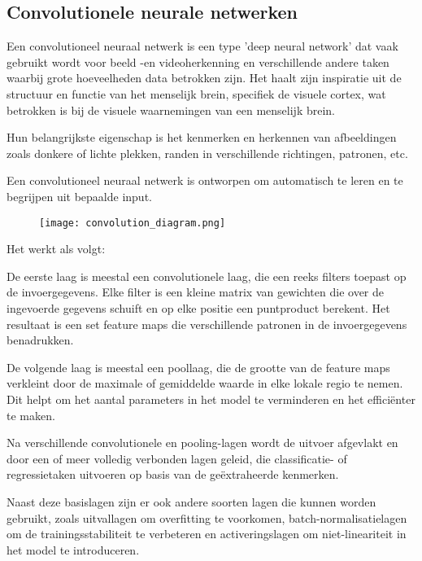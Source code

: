 \subsection{Convolutionele neurale netwerken}

Een convolutioneel neuraal netwerk is een type 'deep neural network' dat vaak gebruikt wordt voor beeld -en videoherkenning en verschillende andere taken waarbij grote hoeveelheden data betrokken zijn. Het haalt zijn inspiratie uit de structuur en functie van het menselijk brein, specifiek de visuele cortex, wat betrokken is bij de visuele waarnemingen van een menselijk brein.

Hun belangrijkste eigenschap is het kenmerken en herkennen van afbeeldingen zoals donkere of lichte plekken, randen in verschillende richtingen, patronen, etc.

Een convolutioneel neuraal netwerk is ontworpen om automatisch te leren en te begrijpen uit bepaalde input. 

\begin{figure}[htbp]
    \centering
    \texttt{[image: convolution\_diagram.png]}
    \caption{\cite{Moor2017}}
    \label{fig:convolution_diagram}
\end{figure}

Het werkt als volgt: 

De eerste laag is meestal een convolutionele laag, die een reeks filters toepast op de invoergegevens. Elke filter is een kleine matrix van gewichten die over de ingevoerde gegevens schuift en op elke positie een puntproduct berekent. Het resultaat is een set feature maps die verschillende patronen in de invoergegevens benadrukken.

De volgende laag is meestal een poollaag, die de grootte van de feature maps verkleint door de maximale of gemiddelde waarde in elke lokale regio te nemen. Dit helpt om het aantal parameters in het model te verminderen en het efficiënter te maken.

Na verschillende convolutionele en pooling-lagen wordt de uitvoer afgevlakt en door een of meer volledig verbonden lagen geleid, die classificatie- of regressietaken uitvoeren op basis van de geëxtraheerde kenmerken.

Naast deze basislagen zijn er ook andere soorten lagen die kunnen worden gebruikt, zoals uitvallagen om overfitting te voorkomen, batch-normalisatielagen om de trainingsstabiliteit te verbeteren en activeringslagen om niet-lineariteit in het model te introduceren.

